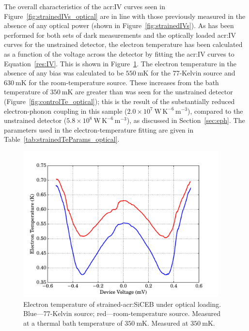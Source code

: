 \par 
The overall characteristics of the \gls{acr:IV} curves seen in Figure~\ref{fig:strainedIVs_optical} are in line with those previously measured in the absence of any optical power (shown in Figure~\ref{fig:strainedIVs}). As has been performed for both sets of dark measurements and the optically loaded \gls{acr:IV} curves for the unstrained detector, the electron temperature has been calculated as a function of the voltage across the detector by fitting the \gls{acr:IV} curves to Equation~\ref{res:IV}. This is shown in Figure~\ref{fig:strainedTe_optical}. The electron temperature in the absence of any bias was calculated to be $550~\mathrm{mK}$ for the 77-Kelvin source and $630~\mathrm{mK}$ for the room-temperature source. These increases from the bath temperature of $350~\mathrm{mK}$ are greater than was seen for the unstrained detector (Figure~\ref{fig:controlTe_optical}); this is the result of the substantially reduced electron-phonon coupling in this sample ($2.0 \times 10^{7}~\mathrm{W\,K^{-6}\,m^{-3}}$), compared to the unstrained detector ($5.8 \times 10^{8}~\mathrm{W\,K^{-6}\,m^{-3}}$), as discussed in Section~\ref{sec:eph}. The parameters used in the electron-temperature fitting are given in Table~\ref{tab:strainedTeParams_optical}.
\begin{figure}[tb]
\begin{center}
\includegraphics[width = 0.95\textwidth]{figures/strained_Te_77_300}
\caption[Electron temperature of strained-\gls{acr:SiCEB} under optical loading]{Electron temperature of strained-\gls{acr:SiCEB} under optical loading. Blue---77-Kelvin source; red---room-temperature source. Measured at a thermal bath temperature of $350~\mathrm{mK}$. Measured at $350~\mathrm{mK}$.}
\label{fig:strainedTe_optical}
\end{center}
\end{figure}
